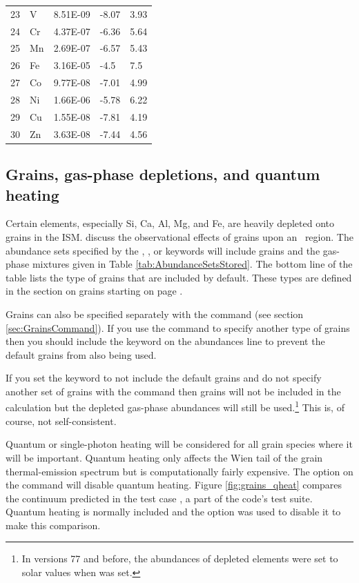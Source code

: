 \begin{table}
\begin{tabular}{lllll}
23& V& 8.51E-09& -8.07& 3.93\\
24& Cr& 4.37E-07& -6.36& 5.64\\
25& Mn& 2.69E-07& -6.57& 5.43\\
26& Fe& 3.16E-05& -4.5& 7.5\\
27& Co& 9.77E-08& -7.01& 4.99\\
28& Ni& 1.66E-06& -5.78& 6.22\\
29& Cu& 1.55E-08& -7.81& 4.19\\
30& Zn& 3.63E-08& -7.44& 4.56\\
\hline
\end{tabular}
\end{table}

\subsection{Grains, gas-phase depletions, and quantum heating}

Certain elements, especially Si, Ca, Al, Mg, and Fe,
are heavily depleted
onto grains in the ISM.
\citet{KingdonFerlandFeibelman1995} discuss the observational
effects of grains upon an \hii\ region.
The abundance sets specified by the
,
, or  keywords
will include grains and the gas-phase
mixtures given in Table \ref{tab:AbundanceSetsStored}.
The bottom line of the table lists the type
of grains that are included by default.
These types are defined in the section on grains
starting on page \pageref{sec:GrainsCommand}.

Grains can also be specified separately with the
 command (see section \ref{sec:GrainsCommand}).
If you use the  command to specify another type
of grains then you should include the keyword
 on the abundances
line to prevent the default grains from also being used.

If you set the keyword  to not include
the default grains and
do not specify another set of grains with the
 command then grains
will not be included in the calculation but the depleted
gas-phase abundances
will still be used.\footnote{In versions 77 and before,
the abundances of depleted elements were
set to solar values when  was set.}
This is, of course, not self-consistent.

Quantum or single-photon heating will be considered for all
grain species where it will be important.
Quantum heating only affects the Wien tail of the grain
thermal-emission spectrum but is computationally fairly expensive.
The  option on the  command
will disable quantum heating.
Figure \ref{fig:grains_qheat} compares the continuum predicted
in the test case ,
a part of the code's test suite.
Quantum heating is normally
included and the  option was used to
disable it to make this comparison.

